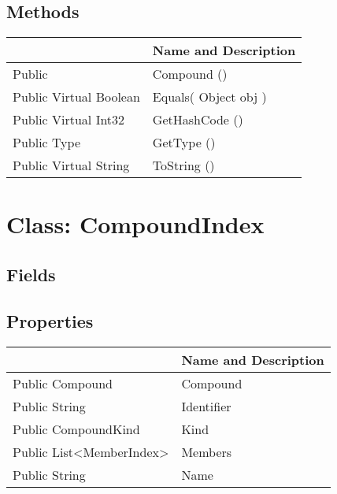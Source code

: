 \documentclass[11pt, oneside, a4paper]{book}
\begin{document}
\subsection{Methods}
\begin{center}
\begin{tabular}{| p{3cm} | p{12cm} | }
\hline
\textbf{ } & \textbf{ Name and Description}\\
\hline
 Public  &  Compound ()\hypertarget{SoftwareEngineeringTools.{}Documentation.{}Compound.{}Compound}{}\\
\hline
 Public  Virtual  Boolean &  Equals(\hypertarget{SoftwareEngineeringTools.{}Documentation.{}Compound.{}Equals\_Object}{} Object  obj  )\\
\hline
 Public  Virtual  Int32 &  GetHashCode ()\hypertarget{SoftwareEngineeringTools.{}Documentation.{}Compound.{}GetHashCode}{}\\
\hline
 Public  Type &  GetType ()\hypertarget{SoftwareEngineeringTools.{}Documentation.{}Compound.{}GetType}{}\\
\hline
 Public  Virtual  String &  ToString ()\hypertarget{SoftwareEngineeringTools.{}Documentation.{}Compound.{}ToString}{}\\
\hline
\end{tabular}
\end{center}
 


\hypertarget{SoftwareEngineeringTools.{}Documentation.{}CompoundIndex}{}
\section{Class: CompoundIndex}

\subsection{Fields}

\subsection{Properties}
\begin{center}
\begin{tabular}{| p{3cm} | p{12cm} | }
\hline
\textbf{ } & \textbf{ Name and Description}\\
\hline
 Public  Compound &  Compound\hypertarget{SoftwareEngineeringTools.{}Documentation.{}CompoundIndex.{}Compound}{}\\
\hline
 Public  String &  Identifier\hypertarget{SoftwareEngineeringTools.{}Documentation.{}CompoundIndex.{}Identifier}{}\\
\hline
 Public  CompoundKind &  Kind\hypertarget{SoftwareEngineeringTools.{}Documentation.{}CompoundIndex.{}Kind}{}\\
\hline
 Public  List<MemberIndex> &  Members\hypertarget{SoftwareEngineeringTools.{}Documentation.{}CompoundIndex.{}Members}{}\\
\hline
 Public  String &  Name\hypertarget{SoftwareEngineeringTools.{}Documentation.{}CompoundIndex.{}Name}{}\\
\hline
\end{tabular}
\end{center}
\end{document}
